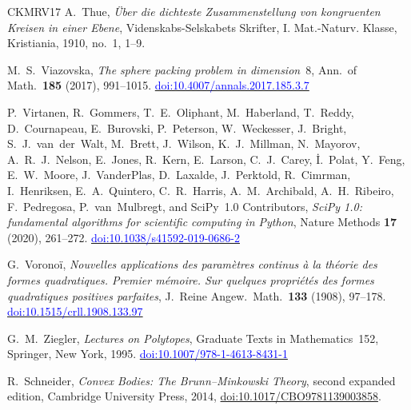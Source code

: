 \documentclass[11pt,reqno]{amsart}
\newcommand{\bluelink}[2]{\href{#1}{\textcolor{blue}{#2}}}
\renewcommand{\_}{\origunderscore\allowbreak}
\numberwithin{equation}{section}
\theoremstyle{plain}
\theoremstyle{definition}
\theoremstyle{remark}
\begin{document}
\begin{thebibliography}{CKMRV17}
A.~Thue,
\textit{\"Uber die dichteste Zusammenstellung von kongruenten Kreisen in einer Ebene},
Videnskabs-Selskabets Skrifter, I. Mat.-Naturv. Klasse, Kristiania,
1910, no.~1, 1--9.

M.~S.~Viazovska,
\textit{The sphere packing problem in dimension~$8$},
Ann.\ of Math.\ \textbf{185} (2017), 991--1015.
\bluelink{https://doi.org/10.4007/annals.2017.185.3.7}{doi:10.4007/annals.2017.185.3.7}

P.~Virtanen, R.~Gommers, T.~E.~Oliphant, M.~Haberland, T.~Reddy,
D.~Cournapeau, E.~Burovski, P.~Peterson, W.~Weckesser, J.~Bright,
S.~J.~van~der~Walt, M.~Brett, J.~Wilson, K.~J.~Millman, N.~Mayorov,
A.~R.~J.~Nelson, E.~Jones, R.~Kern, E.~Larson, C.~J.~Carey,
\.{I}.~Polat, Y.~Feng, E.~W.~Moore, J.~VanderPlas, D.~Laxalde,
J.~Perktold, R.~Cimrman, I.~Henriksen, E.~A.~Quintero, C.~R.~Harris,
A.~M.~Archibald, A.~H.~Ribeiro, F.~Pedregosa, P.~van~Mulbregt, and
SciPy~1.0 Contributors,
\textit{{S}ci{P}y 1.0: fundamental algorithms for scientific computing in
{P}ython},
Nature Methods \textbf{17} (2020), 261--272.
\bluelink{https://doi.org/10.1038/s41592-019-0686-2}{doi:10.1038/s41592-019-0686-2}

G.~Vorono\"i,
\textit{Nouvelles applications des param\`etres continus \`a la th\'eorie des
formes quadratiques. Premier m\'emoire. Sur quelques propri\'et\'es des formes
quadratiques positives parfaites},
J.\ Reine Angew.\ Math.\ \textbf{133} (1908), 97--178.
\bluelink{https://doi.org/10.1515/crll.1908.133.97}{doi:10.1515/crll.1908.133.97}

G.~M.~Ziegler,
\textit{Lectures on Polytopes},
Graduate Texts in Mathematics~152, Springer, New York, 1995.
\bluelink{https://doi.org/10.1007/978-1-4613-8431-1}{doi:10.1007/978-1-4613-8431-1}

 R.~Schneider, \emph{Convex Bodies: The Brunn--Minkowski Theory}, second expanded edition, Cambridge University Press, 2014, \href{https://doi.org/10.1017/CBO9781139003858}{doi:10.1017/CBO9781139003858}.

\end{thebibliography}
\end{document}
